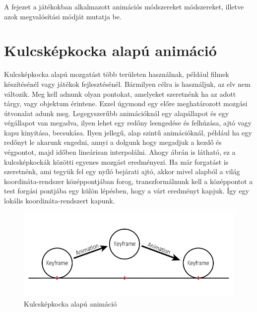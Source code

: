 \label{Chap:animacio}

%
%
%

A fejezet a játékokban alkalmazott animációs módszereket módszereket, illetve azok megvalósítási módját mutatja be.

\section{Kulcsképkocka alapú animáció}

Kulcsképkocka alapú mozgatást több területen használnak, például filmek készítésénél vagy játékok fejlesztésénél. Bármilyen célra is használjuk, az elv nem változik. Meg kell adnunk olyan pontokat, amelyeket szeretnénk ha az adott tárgy, vagy objektum érintene. Ezzel úgymond egy előre meghatározott mozgási útvonalat adunk meg. Legegyszerűbb animációknál egy alapállapot és egy végállapot van megadva, ilyen lehet egy redőny leengedése és felhúzása, ajtó vagy kapu kinyitása, becsukása. Ilyen jellegű, alap szintű animációknál, például ha egy redőnyt le akarunk engedni, annyi a dolgunk hogy megadjuk a kezdő és végpontot, majd időben lineárisan interpolálni. Ahogy  ábrán is látható, ez a kulcsképkockák közötti egyenes mozgást eredményezi. Ha már forgatást is szeretnénk, ami tegyük fel egy nyíló bejárati ajtó, akkor mivel alapból a világ koordináta-rendszer középpontjában forog, transzformálnunk kell a középpontot a test forgási pontjába egy külön lépésben, hogy a várt eredményt kapjuk. Így egy lokális koordináta-rendszert kapunk.

\begin{figure}[h]
\centering
\includegraphics[scale=0.5]{kepek/keyframe_anim.png}
\caption{Kulcsképkocka alapú animáció}
\label{fig:keyframe}
\end{figure}

